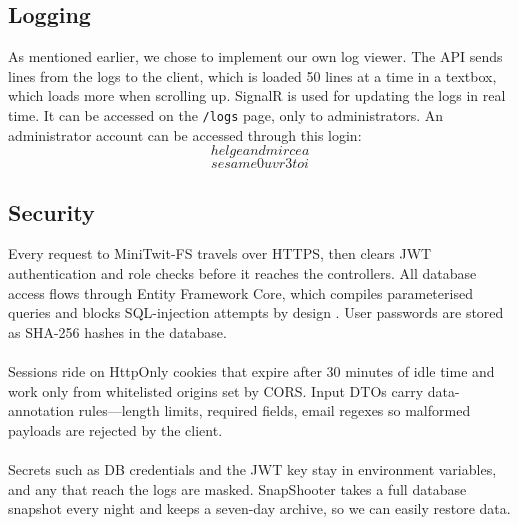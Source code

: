 \subsection{Logging}
As mentioned earlier, we chose to implement our own log viewer. The API sends lines from the logs to the client, which is loaded 50 lines at a time in a textbox, which loads more when scrolling up. SignalR is used for updating the logs in real time. It can be accessed on the \texttt{/logs} page, only to administrators. An administrator account can be accessed through this login:
\begin{equation}
    helgeandmircea
\end{equation}
\begin{equation}
    sesame0uvr3toi
\end{equation}

\subsection{Security}
Every request to MiniTwit-FS travels over HTTPS, then clears JWT authentication and role checks before it reaches the controllers. All database access flows through Entity Framework Core, which compiles parameterised queries and blocks SQL-injection attempts by design \cite{sql-queries}. User passwords are stored as SHA-256 hashes in the database.\\\\
Sessions ride on HttpOnly cookies that expire after 30 minutes of idle time and work only from whitelisted origins set by CORS. Input DTOs carry data-annotation rules—length limits, required fields, email regexes so malformed payloads are rejected by the client.\\\\
Secrets such as DB credentials and the JWT key stay in environment variables, and any that reach the logs are masked. SnapShooter \cite{snapshooter} takes a full database snapshot every night and keeps a seven-day archive, so we can easily restore data.

